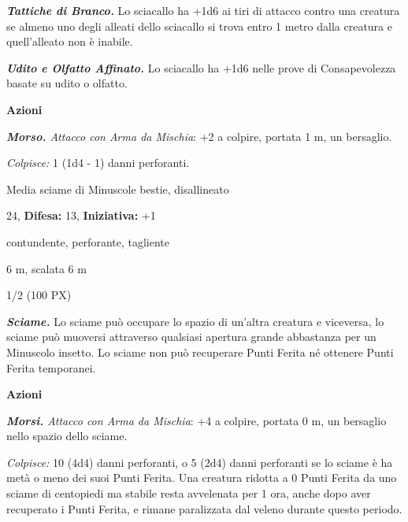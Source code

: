 \begin{multicols}{2}
{\emph{\textbf{Tattiche di Branco.}} Lo sciacallo ha +1d6 ai tiri di attacco contro una creatura se almeno uno degli alleati dello sciacallo si trova entro 1 metro dalla creatura e quell'alleato non è inabile.

\emph{\textbf{Udito e Olfatto Affinato.}} Lo sciacallo ha +1d6 nelle prove di Consapevolezza basate su udito o olfatto.

\textbf{Azioni}

\emph{\textbf{Morso.} Attacco con Arma da Mischia}: +2 a colpire, portata 1 m, un bersaglio.

\emph{Colpisce:} 1 (1d4 - 1) danni perforanti.

\begin{description}[noitemsep, topsep=0pt, parsep=0pt, partopsep=0pt, leftmargin=0cm, labelwidth=2.2cm]
    \item[\textbf{Taglia/Tipo:}] Media sciame di Minuscole bestie, disallineato
    \item[\textbf{Caratt.:}] 
    \item[\textbf{Punti Ferita:}] 24,  \textbf{Difesa:} 13,  \textbf{Iniziativa:} +1
    \item[\textbf{Resistenze al danno:}] contundente, perforante, tagliente
    \item[\textbf{Tiri Salvez.:}] 
    \item[\textbf{Movimento:}] 6 m, scalata 6 m
    \item[\textbf{Sfida:}] 1/2 (100 PX)\smallskip
\end{description}

\emph{\textbf{Sciame.}} Lo sciame può occupare lo spazio di un'altra creatura e viceversa, lo sciame può muoversi attraverso qualsiasi apertura grande abbastanza per un Minuscolo insetto. Lo sciame non può recuperare Punti Ferita né ottenere Punti Ferita temporanei.

\textbf{Azioni}

\emph{\textbf{Morsi.} Attacco con Arma da Mischia}: +4 a colpire, portata 0 m, un bersaglio nello spazio dello sciame.

\emph{Colpisce:} 10 (4d4) danni perforanti, o 5 (2d4) danni perforanti se lo sciame è ha metà o meno dei suoi Punti Ferita. Una creatura ridotta a 0 Punti Ferita da uno sciame di centopiedi ma stabile resta avvelenata per 1 ora, anche dopo aver recuperato i Punti Ferita, e rimane paralizzata dal veleno durante questo periodo.

}
\end{multicols}
